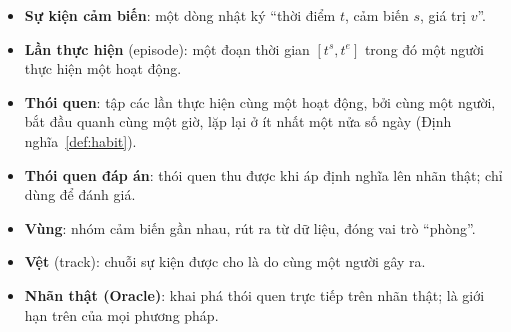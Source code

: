 \vspace{0.8cm}
\begin{itemize}
  \item \textbf{Sự kiện cảm biến}: một dòng nhật ký ``thời điểm $t$, cảm biến $s$, giá trị $v$''.
  \item \textbf{Lần thực hiện} (episode): một đoạn thời gian $[t^{s}, t^{e}]$ trong đó một người thực hiện
        một hoạt động.
  \item \textbf{Thói quen}: tập các lần thực hiện cùng một hoạt động, bởi cùng một người, bắt đầu quanh
        cùng một giờ, lặp lại ở ít nhất một nửa số ngày (Định nghĩa~\ref{def:habit}).
  \item \textbf{Thói quen đáp án}: thói quen thu được khi áp định nghĩa lên nhãn thật; chỉ dùng để đánh giá.
  \item \textbf{Vùng}: nhóm cảm biến gần nhau, rút ra từ dữ liệu, đóng vai trò ``phòng''.
  \item \textbf{Vệt} (track): chuỗi sự kiện được cho là do cùng một người gây ra.
  \item \textbf{Nhãn thật (Oracle)}: khai phá thói quen trực tiếp trên nhãn thật; là giới hạn trên của
        mọi phương pháp.
\end{itemize}
